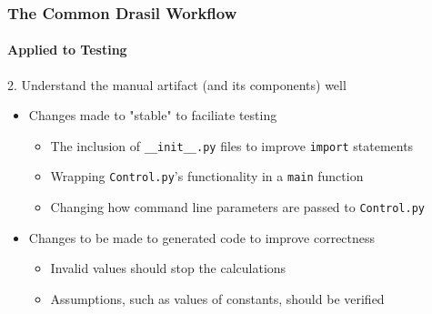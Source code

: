 \begin{frame}
    \frametitle{The Common Drasil Workflow}
    \framesubtitle{Applied to Testing}

    2. Understand the manual artifact (and its components) well
    \begin{itemize}
        \item<2-> Changes made to "stable" to faciliate testing
              \begin{itemize}
                  \item The inclusion of \texttt{\_\_init\_\_.py} files to
                        improve \texttt{import} statements
                  \item Wrapping \texttt{Control.py}'s functionality in a
                        \texttt{main} function
                  \item Changing how command line parameters are
                        passed to \texttt{Control.py}
              \end{itemize}
        \item<3-> Changes to be made to generated code to improve correctness
              \begin{itemize}
                  \item Invalid values should stop the calculations
                        \cite{projectile_current}
                  \item Assumptions, such as values of constants, should be
                        verified
              \end{itemize}
    \end{itemize}

\end{frame}
